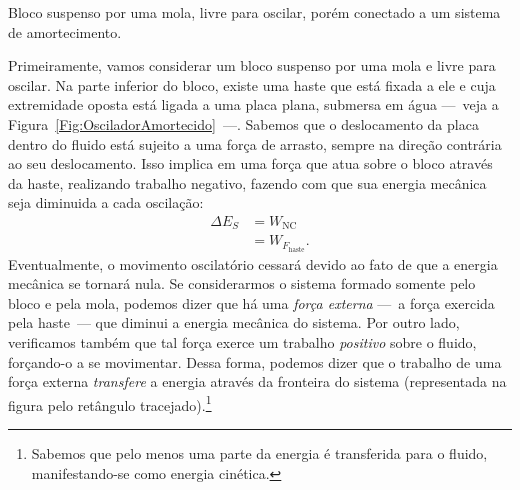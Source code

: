 \begin{marginfigure}[5cm]
\centering
{}
\caption{Bloco suspenso por uma mola, livre para oscilar, porém conectado a um sistema de amortecimento.\label{Fig:OsciladorAmortecido}}
\end{marginfigure}

Primeiramente, vamos considerar um bloco suspenso por uma mola e livre para oscilar. Na parte inferior do bloco, existe uma haste que está fixada a ele e cuja extremidade oposta está ligada a uma placa plana, submersa em água ---~veja a Figura~\ref{Fig:OsciladorAmortecido}~---. Sabemos que o deslocamento da placa dentro do fluido está sujeito a uma força de arrasto, sempre na direção contrária ao seu deslocamento. Isso implica em uma força que atua sobre o bloco através da haste, realizando trabalho negativo, fazendo com que sua energia mecânica seja diminuida a cada oscilação:
\begin{align}
    \Delta E_S &= W_{\textrm{NC}} \\
    &= W_{F_{\textrm{haste}}}.
\end{align}
%
Eventualmente, o movimento oscilatório cessará devido ao fato de que a energia mecânica se tornará nula. Se considerarmos o sistema formado somente pelo bloco e pela mola, podemos dizer que há uma \emph{força externa} ---~a força exercida pela haste~--- que diminui a energia mecânica do sistema. Por outro lado, verificamos também que tal força exerce um trabalho \emph{positivo} sobre o fluido, forçando-o a se movimentar. Dessa forma, podemos dizer que o trabalho de uma força externa \emph{transfere} a energia através da fronteira do sistema (representada na figura pelo retângulo tracejado).\footnote{Sabemos que pelo menos uma parte da energia é transferida para o fluido, manifestando-se como energia cinética.}

